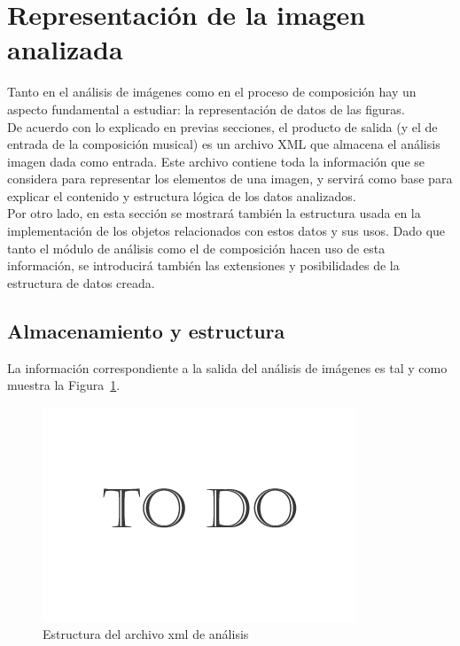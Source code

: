 \section{Representación de la imagen analizada}

Tanto en el análisis de imágenes como en el proceso de composición hay un aspecto fundamental a estudiar: la representación de datos de las figuras.\\

De acuerdo con lo explicado en previas secciones, el producto de salida  (y el de entrada de la composición musical) es un archivo XML que almacena el análisis imagen dada como entrada. Este archivo contiene toda la información que se considera para representar los elementos de una imagen, y servirá como base para explicar el contenido y estructura lógica de los datos analizados.\\

Por otro lado, en esta sección se mostrará también la estructura usada en la implementación de los objetos relacionados con estos datos y sus usos. Dado que tanto el módulo de análisis como el de composición hacen uso de esta información, se introducirá también las extensiones y posibilidades de la estructura de datos creada.

\subsection{Almacenamiento y estructura}
\label{subsec:xmlstruct}

	La información correspondiente a la salida del análisis de imágenes es tal y como muestra la Figura~\ref{fig:estructuraFiguras}.\\

			\begin{figure}[htbp]
			\centering
			\includegraphics[scale=0.47]{graphics/todo.png}
			\caption{Estructura del archivo xml de análisis}
			\label{fig:estructuraFiguras}
			\end{figure}
		
